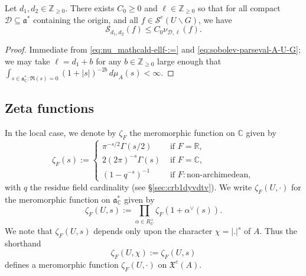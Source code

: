 \begin{lemma}\label{lem:standard2:let-d_1-d_2}
  Let $d_1, d_2 \in \mathbb{Z}_{\geq 0}$.  There exists $C_0 \geq 0$ and $\ell \in \mathbb{Z}_{\geq 0}$ so that for all compact $\mathcal{D} \subseteq \mathfrak{a}^*$ containing the origin, and all $f \in \mathcal{S}^e(U \backslash G)$, we have
  \begin{equation*}
    \mathcal{S}_{d_1,d_2}(f) \leq C_0 \nu_{\mathcal{D},\ell}(f).
  \end{equation*}
\end{lemma}
\begin{proof}
  Immediate from \eqref{eq:nu_mathcald-ellf-:=} and \eqref{eq:sobolev-parseval-A-U-G}; we may take $\ell = d_1 + b$ for any $b \in \mathbb{Z}_{\geq 0}$ large enough that $\int_{s \in \mathfrak{a}_{\mathbb{C}}^* : \Re(s) = 0} (1 + |s|)^{-2 b} \, d \mu_A(s) < \infty$.
\end{proof}


\subsection{Zeta functions}\label{sec:local-zeta-functions}
In the local case, we denote by $\zeta_F$ the meromorphic function on $\mathbb{C}$ given by 
\begin{equation*}
  \zeta_F(s) :=
  \begin{cases}
    \pi^{-s/2} \Gamma(s/2) & \text{ if } F = \mathbb{R}, \\
    2 (2 \pi ) ^{- s} \Gamma (s) &  \text{ if } F = \mathbb{C}, \\
    (1 - q^{-s})^{-1} & \text{ if } F: \text{non-archimedean},
  \end{cases}
\end{equation*}
with $q$ the residue field cardinality (see \S\ref{sec:crb1dyvdtv}).  We write $\zeta_F(U,\cdot)$ for the meromorphic function on $\mathfrak{a}_{\mathbb{C}}^*$ given by
\begin{equation*}
  \zeta_F(U,s) := \prod_{\alpha \in R_U^+} \zeta_F(1 + \alpha^\vee(s)).
\end{equation*}
We note that $\zeta_F(U,s)$ depends only upon the character $\chi = |.|^s$ of $A$.  Thus the shorthand 
\begin{equation*}
  \zeta_F(U,\chi) := \zeta_F(U,s)
\end{equation*}
defines a meromorphic function $\zeta_F(U,\cdot)$ on $\mathfrak{X}^e(A)$.

